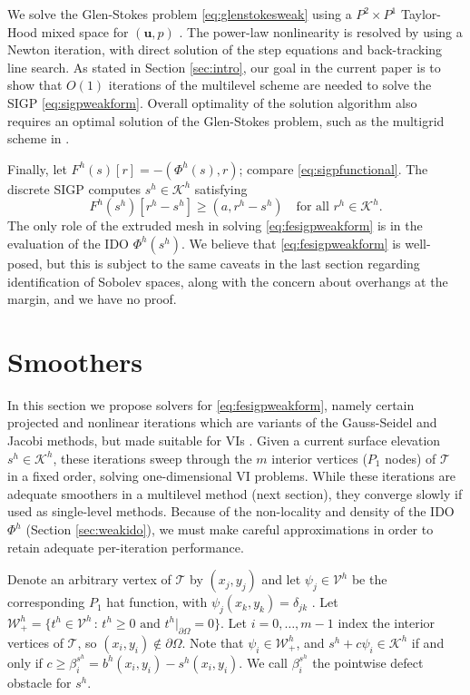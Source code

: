 \documentclass[letterpaper,final,12pt,reqno]{amsart}
\theoremstyle{claim}
\newcommand{\bu}{\mathbf{u}}
\newcommand{\ip}[2]{\left(#1,#2\right)}
\numberwithin{equation}{section}
\numberwithin{figure}{section}
\numberwithin{table}{section}
\numberwithin{theorem}{section}
\begin{document}
We solve the Glen-Stokes problem \eqref{eq:glenstokesweak} using a $P^2 \times P^1$ Taylor-Hood mixed space for $(\bu,p)$ \cite{Elmanetal2014}.  The power-law nonlinearity is resolved by using a Newton iteration, with direct solution of the step equations and back-tracking line search.  As stated in Section \ref{sec:intro}, our goal in the current paper is to show that $O(1)$ iterations of the multilevel scheme are needed to solve the SIGP \eqref{eq:sigpweakform}.  Overall optimality of the solution algorithm also requires an optimal solution of the Glen-Stokes problem, such as the multigrid scheme in \cite{IsaacStadlerGhattas2015}.

Finally, let $F^h(s)[r] = - \ip{\Phi^h(s)}{r}$; compare \eqref{eq:sigpfunctional}.  The discrete SIGP computes $s^h \in \mathcal{K}^h$ satisfying
\begin{equation}
F^h(s^h)[r^h - s^h] \ge \ip{a}{r^h-s^h} \quad \text{for all } r^h \in \mathcal{K}^h. \label{eq:fesigpweakform}
\end{equation}
The only role of the extruded mesh in solving \eqref{eq:fesigpweakform} is in the evaluation of the IDO $\Phi^h(s^h)$.  We believe that \eqref{eq:fesigpweakform} is well-posed, but this is subject to the same caveats in the last section regarding identification of Sobolev spaces, along with the concern about overhangs at the margin, and we have no proof.


\section{Smoothers} \label{sec:smoothers}

In this section we propose solvers for \eqref{eq:fesigpweakform}, namely certain projected and nonlinear iterations which are variants of the Gauss-Seidel and Jacobi methods, but made suitable for VIs \cite{KinderlehrerStampacchia1980}.  Given a current surface elevation $s^h\in \mathcal{K}^h$, these iterations sweep through the $m$ interior vertices ($P_1$ nodes) of $\mathcal{T}$ in a fixed order, solving one-dimensional VI problems.  While these iterations are adequate smoothers in a multilevel method (next section), they converge slowly if used as single-level methods.  Because of the non-locality and density of the IDO $\Phi^h$ (Section \ref{sec:weakido}), we must make careful approximations in order to retain adequate per-iteration performance.

Denote an arbitrary vertex of $\mathcal{T}$ by $(x_j,y_j)$ and let $\psi_j \in \mathcal{V}^h$ be the corresponding $P_1$ hat function, with $\psi_j(x_k,y_k)=\delta_{jk}$ \cite{Elmanetal2014}.  Let $\mathcal{W}_+^h = \{t^h \in \mathcal{V}^h \,:\, t^h \ge 0 \text{ and } t^h|_{\partial\Omega} = 0\}$.  Let $i=0,\dots,m-1$ index the interior vertices of $\mathcal{T}$, so $(x_i,y_i) \notin \partial\Omega$.  Note that $\psi_i \in \mathcal{W}_+^h$, and $s^h + c \psi_i \in \mathcal{K}^h$ if and only if $c\ge \beta_i^{s^h} = b^h(x_i,y_i) - s^h(x_i,y_i)$.  We call $\beta_i^{s^h}$ the pointwise defect obstacle \cite{GraeserKornhuber2009} for $s^h$.
\end{document}

